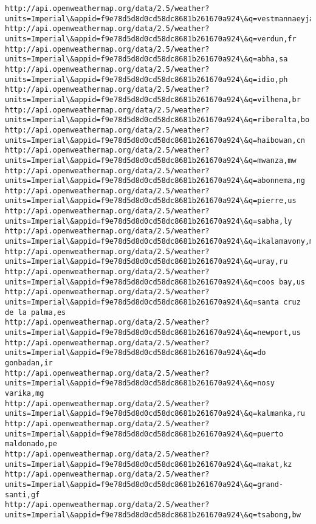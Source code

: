 \documentclass[11pt]{article}
\begin{document}
\begin{Verbatim}[commandchars=\\\{\}]
http://api.openweathermap.org/data/2.5/weather?units=Imperial\&appid=f9e78d5d8d0cd58dc8681b261670a924\&q=vestmannaeyjar,is
http://api.openweathermap.org/data/2.5/weather?units=Imperial\&appid=f9e78d5d8d0cd58dc8681b261670a924\&q=verdun,fr
http://api.openweathermap.org/data/2.5/weather?units=Imperial\&appid=f9e78d5d8d0cd58dc8681b261670a924\&q=abha,sa
http://api.openweathermap.org/data/2.5/weather?units=Imperial\&appid=f9e78d5d8d0cd58dc8681b261670a924\&q=idio,ph
http://api.openweathermap.org/data/2.5/weather?units=Imperial\&appid=f9e78d5d8d0cd58dc8681b261670a924\&q=vilhena,br
http://api.openweathermap.org/data/2.5/weather?units=Imperial\&appid=f9e78d5d8d0cd58dc8681b261670a924\&q=riberalta,bo
http://api.openweathermap.org/data/2.5/weather?units=Imperial\&appid=f9e78d5d8d0cd58dc8681b261670a924\&q=haibowan,cn
http://api.openweathermap.org/data/2.5/weather?units=Imperial\&appid=f9e78d5d8d0cd58dc8681b261670a924\&q=mwanza,mw
http://api.openweathermap.org/data/2.5/weather?units=Imperial\&appid=f9e78d5d8d0cd58dc8681b261670a924\&q=abonnema,ng
http://api.openweathermap.org/data/2.5/weather?units=Imperial\&appid=f9e78d5d8d0cd58dc8681b261670a924\&q=pierre,us
http://api.openweathermap.org/data/2.5/weather?units=Imperial\&appid=f9e78d5d8d0cd58dc8681b261670a924\&q=sabha,ly
http://api.openweathermap.org/data/2.5/weather?units=Imperial\&appid=f9e78d5d8d0cd58dc8681b261670a924\&q=ikalamavony,mg
http://api.openweathermap.org/data/2.5/weather?units=Imperial\&appid=f9e78d5d8d0cd58dc8681b261670a924\&q=uray,ru
http://api.openweathermap.org/data/2.5/weather?units=Imperial\&appid=f9e78d5d8d0cd58dc8681b261670a924\&q=coos bay,us
http://api.openweathermap.org/data/2.5/weather?units=Imperial\&appid=f9e78d5d8d0cd58dc8681b261670a924\&q=santa cruz de la palma,es
http://api.openweathermap.org/data/2.5/weather?units=Imperial\&appid=f9e78d5d8d0cd58dc8681b261670a924\&q=newport,us
http://api.openweathermap.org/data/2.5/weather?units=Imperial\&appid=f9e78d5d8d0cd58dc8681b261670a924\&q=do gonbadan,ir
http://api.openweathermap.org/data/2.5/weather?units=Imperial\&appid=f9e78d5d8d0cd58dc8681b261670a924\&q=nosy varika,mg
http://api.openweathermap.org/data/2.5/weather?units=Imperial\&appid=f9e78d5d8d0cd58dc8681b261670a924\&q=kalmanka,ru
http://api.openweathermap.org/data/2.5/weather?units=Imperial\&appid=f9e78d5d8d0cd58dc8681b261670a924\&q=puerto maldonado,pe
http://api.openweathermap.org/data/2.5/weather?units=Imperial\&appid=f9e78d5d8d0cd58dc8681b261670a924\&q=makat,kz
http://api.openweathermap.org/data/2.5/weather?units=Imperial\&appid=f9e78d5d8d0cd58dc8681b261670a924\&q=grand-santi,gf
http://api.openweathermap.org/data/2.5/weather?units=Imperial\&appid=f9e78d5d8d0cd58dc8681b261670a924\&q=tsabong,bw

\end{Verbatim}
\end{document}
